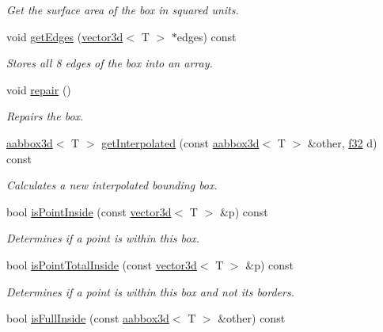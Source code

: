 \begin{DoxyCompactItemize}
\begin{DoxyCompactList}\small\item\em Get the surface area of the box in squared units. \end{DoxyCompactList}\item 
void \hyperlink{classirr_1_1core_1_1aabbox3d_a2b35e19c6c400c4c3d2b92ced108ca79}{get\+Edges} (\hyperlink{classirr_1_1core_1_1vector3d}{vector3d}$<$ T $>$ $\ast$edges) const 
\begin{DoxyCompactList}\small\item\em Stores all 8 edges of the box into an array. \end{DoxyCompactList}\item 
void \hyperlink{classirr_1_1core_1_1aabbox3d_a904b14e6b6a99187820a7407b5d7cf23}{repair} ()
\begin{DoxyCompactList}\small\item\em Repairs the box. \end{DoxyCompactList}\item 
\hyperlink{classirr_1_1core_1_1aabbox3d}{aabbox3d}$<$ T $>$ \hyperlink{classirr_1_1core_1_1aabbox3d_a9dc0f5991971a440532f924584306814}{get\+Interpolated} (const \hyperlink{classirr_1_1core_1_1aabbox3d}{aabbox3d}$<$ T $>$ \&other, \hyperlink{namespaceirr_a0277be98d67dc26ff93b1a6a1d086b07}{f32} d) const 
\begin{DoxyCompactList}\small\item\em Calculates a new interpolated bounding box. \end{DoxyCompactList}\item 
bool \hyperlink{classirr_1_1core_1_1aabbox3d_aee439d703d121617c3bd6095c93e6852}{is\+Point\+Inside} (const \hyperlink{classirr_1_1core_1_1vector3d}{vector3d}$<$ T $>$ \&p) const 
\begin{DoxyCompactList}\small\item\em Determines if a point is within this box. \end{DoxyCompactList}\item 
bool \hyperlink{classirr_1_1core_1_1aabbox3d_a4e5d76484af9f3da23c1d5d3bb8bac9f}{is\+Point\+Total\+Inside} (const \hyperlink{classirr_1_1core_1_1vector3d}{vector3d}$<$ T $>$ \&p) const 
\begin{DoxyCompactList}\small\item\em Determines if a point is within this box and not its borders. \end{DoxyCompactList}\item 
bool \hyperlink{classirr_1_1core_1_1aabbox3d_a05f821fed7111655366fd8b3e9d8036f}{is\+Full\+Inside} (const \hyperlink{classirr_1_1core_1_1aabbox3d}{aabbox3d}$<$ T $>$ \&other) const 

\end{DoxyCompactItemize}
